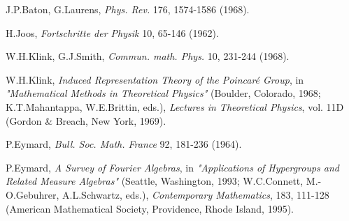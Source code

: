 \documentclass[a4paper,11pt]{article}
\begin{document}
\begin{list}
\item J.P.Baton, G.Laurens, {\it Phys. Rev.} 176, 1574-1586 (1968).
\item H.Joos, {\it Fortschritte der Physik} 10, 65-146 (1962).
\item W.H.Klink, G.J.Smith, {\it Commun. math. Phys.} 10, 231-244 (1968).
\item W.H.Klink, {\it Induced Representation Theory of the Poincar\'e  Group}, in {\it "Mathematical 
Methods 
in Theoretical Physics"}  (Boulder, Colorado, 1968; K.T.Mahantappa, W.E.Brittin, eds.), 
{\it Lectures in Theoretical Physics}, vol. 11D (Gordon \& Breach, New York, 1969).
\item P.Eymard, {\it Bull. Soc. Math. France} 92, 181-236 (1964).
\item P.Eymard, {\it A Survey of Fourier Algebras}, in {\it "Applications of Hypergroups and Related 
Measure Algebras"}  (Seattle, Washington, 1993; W.C.Connett, M.-O.Gebuhrer, A.L.Schwartz, 
eds.), {\it Contemporary Mathematics}, 183, 111-128 (American Mathematical Society, Providence, 
Rhode Island, 1995).

\end{list}
\end{document}
